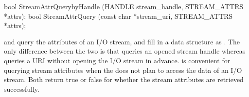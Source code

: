 

\begin{paldef}
bool StreamAttrQuerybyHandle (HANDLE stream_handle,
                              STREAM_ATTRS *attrs);
bool StreamAttrQuery (const char *stream_uri, STREAM_ATTRS *attrs);

\end{paldef}

 and  query the attributes of an I/O stream, and fill in a data structure as .
The only difference between the two \hostapis{} is that  queries an opened stream handle whereas  queries a URI without opening the I/O stream in advance.
 is convenient for querying stream attributes when the \libos{} does not plan to access the data of an I/O stream.
Both \hostapis{} return true or false for whether the stream attributes are retrieved successfully.







